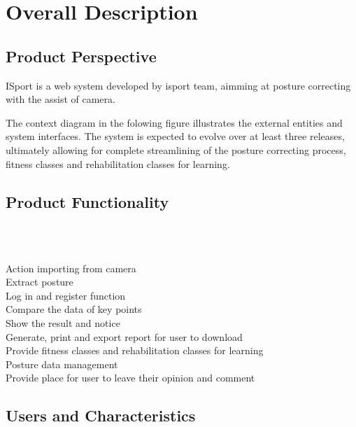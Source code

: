 \documentclass[16pt]{scrreprt}
\begin{document}
\chapter{Overall Description}
\label{Overall Description}

\section{Product Perspective}

ISport is a web system developed by isport team, aimming at posture correcting with the assist of camera.

The context diagram in the folowing figure illustrates the external entities and system interfaces. The system is expected to evolve over at least three releases, ultimately allowing for complete streamlining of the posture correcting process, fitness classes and rehabilitation classes for learning.

\section{Product Functionality}

\\\

Action importing from camera\\

Extract posture\\

Log in and register function\\

Compare the data of key points\\

Show the result and notice\\

Generate, print and export report for user to download\\

Provide fitness classes and rehabilitation classes for learning\\

Posture data management\\

Provide place for user to leave their opinion and comment\\


\section{Users and Characteristics}
\end{document}

